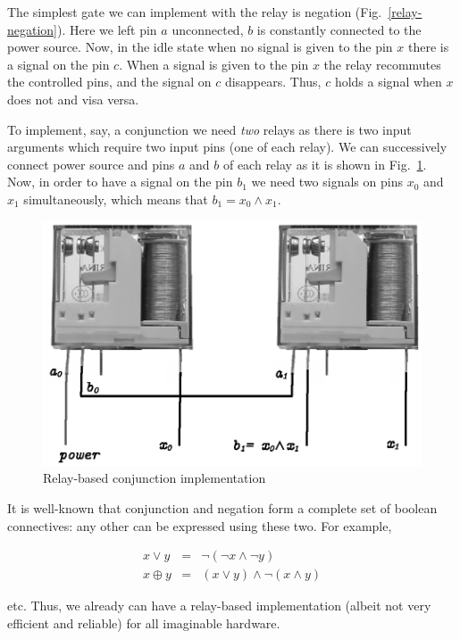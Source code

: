 The simplest gate we can implement with the relay is negation (Fig.~\ref{relay-negation}). Here we left pin $a$ unconnected, $b$ is
constantly connected to the power source. Now, in the idle state when no signal is given to the pin $x$ there is a signal on the
pin $c$. When a signal is given to the pin $x$ the relay recommutes the controlled pins, and the signal on $c$ disappears. Thus,
$c$ holds a signal when $x$ does not and visa versa.

To implement, say, a conjunction we need \emph{two} relays as there is two input arguments which require two input
pins (one of each relay). We can successively connect power source and pins $a$ and $b$ of each relay as it is
shown in Fig.~\ref{relay-conjunction}. Now, in order to have a signal on the pin $b_1$ we need two signals on
pins $x_0$ and $x_1$ simultaneously, which means that $b_1=x_0\wedge x_1$. 

\begin{figure}[t]
  \centering
  \includegraphics{images/06-09.eps}
  \caption{Relay-based conjunction implementation}
  \label{relay-conjunction}
\end{figure}

It is well-known that conjunction and negation form a complete set of boolean connectives: any other can be expressed
using these two. For example,

\[
\begin{array}{rcl}
  x\vee y & = & \neg (\neg x \wedge \neg y) \\
  x\oplus y & = & (x \vee y) \wedge \neg (x \wedge y)
\end{array}
\]

etc. Thus, we already can have a relay-based implementation (albeit not very efficient and reliable) for all imaginable
hardware.

